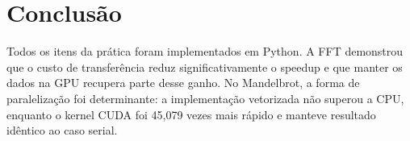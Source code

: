 \section{Conclusão}

Todos os itens da prática foram implementados em Python. A FFT demonstrou que
o custo de transferência reduz significativamente o speedup e que manter os
dados na GPU recupera parte desse ganho. No Mandelbrot, a forma de
paralelização foi determinante: a implementação vetorizada não superou a CPU,
enquanto o kernel CUDA foi 45,079 vezes mais rápido e manteve resultado
idêntico ao caso serial.
